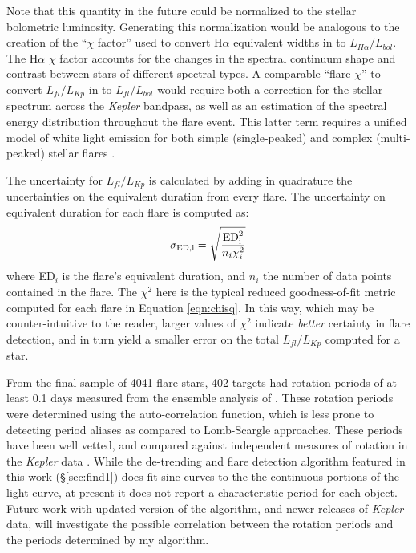 \documentclass[twocolumn]{aastex6}
\newcommand{\Kepler}{\textsl{Kepler}\xspace}
\begin{document}
Note that this quantity in the future could be normalized to the stellar bolometric luminosity. Generating this normalization would be analogous to the creation of the ``$\chi$ factor'' used to convert H$\alpha$ equivalent widths in to $L_{H\alpha}/L_{bol}$. The H$\alpha$ $\chi$ factor accounts for the changes in the spectral continuum shape and contrast between stars of different spectral types. A comparable ``flare $\chi$'' to convert $L_{fl}/L_{Kp}$ in to $L_{fl}/L_{bol}$ would require both a correction for the stellar spectrum across the \Kepler bandpass, as well as an estimation of the spectral energy distribution throughout the flare event. This latter term requires a unified model of white light emission for both simple (single-peaked) and complex (multi-peaked) stellar flares \citep{allred2015}.


The uncertainty for $L_{fl}/L_{Kp}$ is calculated by adding in quadrature the uncertainties on the equivalent duration from every flare. The uncertainty on equivalent duration for each flare is computed as:
\begin{equation}
\sigma_{\rm{ED},i} =  \sqrt{\frac{\rm{ED}_i^2}{ n_i \chi_i^2}}
\end{equation}
where ED$_i$ is the flare's equivalent duration, and $n_i$ the number of data points contained in the flare. The $\chi^2$ here is the typical reduced goodness-of-fit metric computed for each flare in Equation \ref{eqn:chisq}. In this way, which may be counter-intuitive to the reader, larger values of $\chi^2$ indicate {\it better} certainty in flare detection, and in turn yield a smaller error on the total $L_{fl}/L_{Kp}$ computed for a star.



From the final sample of 4041 flare stars, 402 targets had rotation periods of at least 0.1 days measured from the ensemble analysis of \citet{mcquillan2014}. 
These rotation periods were determined using the auto-correlation function, which is less prone to detecting period aliases as compared to Lomb-Scargle approaches. These periods have been well vetted, and compared against independent measures of rotation in the \Kepler data \citep{reinhold2013}.
While the de-trending and flare detection algorithm featured in this work (\S\ref{sec:find1}) does fit sine curves to the the continuous portions of the light curve, at present it does not report a characteristic period for each object. Future work with updated version of the algorithm, and newer releases of \Kepler data, will investigate the possible correlation between the \citet{mcquillan2014} rotation periods and the periods determined by my algorithm. 
\end{document}
